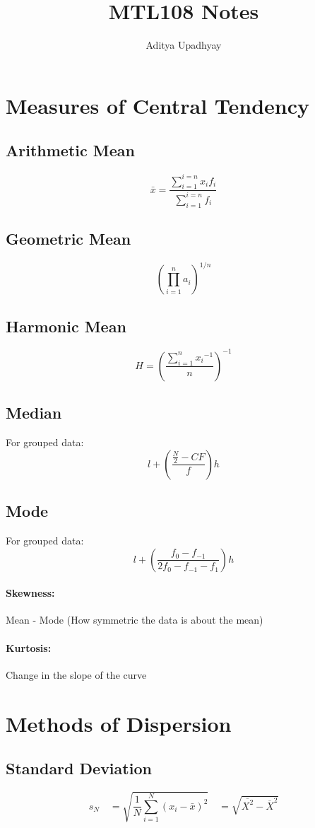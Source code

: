 \documentclass[12pt]{article}
\title{MTL108 Notes}
\author{Aditya Upadhyay}
\date{}
\begin{document}
\maketitle
\section{Measures of Central Tendency}
\subsection{Arithmetic Mean}
\[\bar{x} = \frac{ \sum_{i=1}^{i=n} {x_i}{f_i} }{\sum_{i=1}^{i=n} f_i}  \]

\subsection{Geometric Mean}
\[ {\left( \prod_{i=1}^{n} a_i \right)}^{1/n} \]

\subsection{Harmonic Mean}
\[ H= {\left( \frac{\sum_{i=1}^{n} {x_i}^{-1} }{n}\right)}^{-1}\]

\subsection{Median}
For grouped data: \[ l + \left(\frac{\frac{N}{2}-CF}{f}\right)h\]

\subsection{Mode}
For grouped data: \[   l+ \left( \frac{f_0 - f_{-1}}{2f_0 - f_{-1} - f_1} \right)h \]
\paragraph{Skewness:}
Mean - Mode    (How symmetric the data is about the mean)
\paragraph{Kurtosis:}
Change in the slope of the curve
\newpage
\section{Methods of Dispersion}
\subsection{Standard Deviation}
\[ 
s_N \quad= \sqrt{\frac{1}{N} \sum_{i=1}^{N} {(x_i - \bar{x})}^2 } \quad = \sqrt{\overline{{X}^2} - {\overline{X}}^2}
\]
\end{document}
